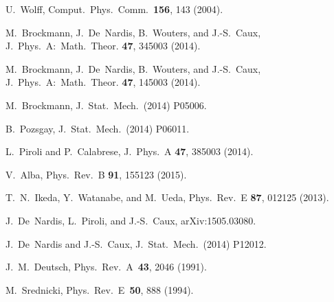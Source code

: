 \documentclass[11pt]{iopart}
\begin{document}
\begin{thebibliography}{99}
U.~Wolff, Comput.\ Phys.\ Comm.\ {\bf 156}, 143 (2004). 

M.~Brockmann, J.~De~Nardis, B.~Wouters, and J.-S.~Caux, J.\ Phys.\ A:\ 
Math.\ Theor. {\bf 47}, 345003 (2014). 

M.~Brockmann, J.~De~Nardis, B.~Wouters, and J.-S.~Caux, J.\ Phys.\ A:\ 
Math.\ Theor. {\bf 47}, 145003 (2014). 

M.~Brockmann, J.\ Stat.\ Mech.\ (2014) P05006. 

B.~Pozsgay, J.\ Stat.\ Mech.\ (2014) P06011. 

L.~Piroli and P.~Calabrese, J.\ Phys.\ A {\bf 47}, 385003 (2014). 

V.~Alba, Phys.\ Rev.\ B {\bf 91}, 155123 (2015). 

T.~N.~Ikeda, Y.~Watanabe, and M.~Ueda, Phys.\ Rev.\ E {\bf 87}, 012125 (2013). 

J.~De~Nardis, L.~Piroli, and J.-S.~Caux, arXiv:1505.03080. 

J.~De~Nardis and J.-S.~Caux, J.\ Stat.\ Mech.\ (2014) P12012. 

J.~M.~Deutsch, Phys.\ Rev.\ A\ {\bf 43}, 2046 (1991).

M.~Srednicki, Phys.\ Rev.\ E\ {\bf 50}, 888 (1994).


\end{thebibliography}
\end{document}
